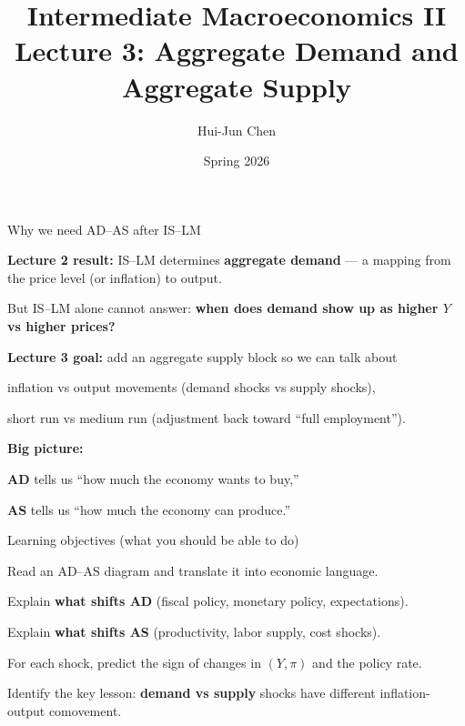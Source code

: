 \documentclass[aspectratio=169,xcolor=dvipsnames]{beamer}
\title[Lecture 3: AD--AS]{Intermediate Macroeconomics II\\\vspace{4pt}Lecture 3: Aggregate Demand and Aggregate Supply}
\author[Hui-Jun Chen]{Hui-Jun Chen}
\institute[]{National Tsing Hua University}
\date{Spring 2026}
\let\tempone\itemize
\let\temptwo\enditemize
\renewenvironment{itemize}{\tempone\addtolength{\itemsep}{\fill}}{\temptwo}
\let\tempa\enumerate
\let\tempb\endenumerate
\renewenvironment{enumerate}{\tempa\addtolength{\itemsep}{\fill}}{\tempb}
\begin{document}
\begin{frame}
    \titlepage
\end{frame}

\begin{frame}{Why we need AD--AS after IS--LM}
\begin{itemize}
\item \textbf{Lecture 2 result:} IS--LM determines \textbf{aggregate demand} --- a mapping from the price level (or inflation) to output.
\item But IS--LM alone cannot answer: \textbf{when does demand show up as higher $Y$ vs higher prices?}
\item \textbf{Lecture 3 goal:} add an aggregate supply block so we can talk about
\begin{itemize}
\item inflation vs output movements (demand shocks vs supply shocks),
\item short run vs medium run (adjustment back toward ``full employment'').
\end{itemize}
\end{itemize}

\vspace{0.3em}
\textbf{Big picture:}
\begin{itemize}
    \item \textbf{AD} tells us ``how much the economy wants to buy,''
    \item \textbf{AS} tells us ``how much the economy can produce.''
\end{itemize}
\end{frame}

\begin{frame}{Learning objectives (what you should be able to do)}
\begin{enumerate}
\item Read an AD--AS diagram and translate it into economic language.
\item Explain \textbf{what shifts AD} (fiscal policy, monetary policy, expectations).
\item Explain \textbf{what shifts AS} (productivity, labor supply, cost shocks).
\item For each shock, predict the sign of changes in $(Y,\pi)$ and the policy rate.
\item Identify the key lesson: \textbf{demand vs supply} shocks have different inflation-output comovement.
\end{enumerate}
\end{frame}
\end{document}
